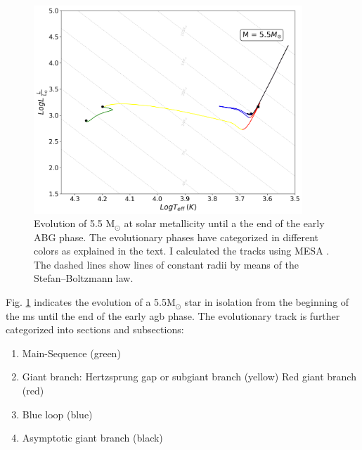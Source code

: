 \begin{figure}[H]
    \centering
    \includegraphics[width=0.9\textwidth]{Thesis/graphs/HR_evolution.pdf}
    \caption{Evolution of 5.5 M$_{\odot}$ at solar metallicity until a the end of the early ABG phase. The evolutionary phases have categorized in different colors as explained in the text. I calculated the tracks using MESA \citep{paxton2010modules,paxton2013modules,paxton2015modules,paxton2019modules}. The dashed lines show lines of constant radii by means of the Stefan–Boltzmann law.}
    \label{fig:HR_evolution}
\end{figure}
Fig. \ref{fig:HR_evolution} indicates the evolution of a 5.5M$_{\odot}$ star in isolation from the beginning of the \ac{ms} until the end of the early \ac{agb} phase. The evolutionary track is further categorized into sections and subsections: 
\begin{enumerate}
    \item Main-Sequence (green)
    \item Giant branch: 
        \subitem Hertzsprung gap or subgiant branch (yellow) 
        \subitem Red giant branch (red)
    \item Blue loop (blue)
    \item Asymptotic giant branch (black)
\end{enumerate}

